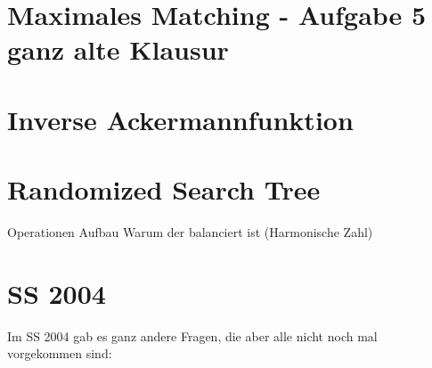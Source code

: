 \documentclass[10pt,a4paper]{article}
\begin{document}
%	

\section*{Maximales Matching - Aufgabe 5 ganz alte Klausur}

\section*{Inverse Ackermannfunktion}

\section*{Randomized Search Tree}
Operationen
Aufbau
Warum der balanciert ist (Harmonische Zahl)

\section*{SS 2004}
Im SS 2004 gab es ganz andere Fragen, die aber alle nicht noch mal vorgekommen sind:
\begin{center}
\end{center}
\end{document}
